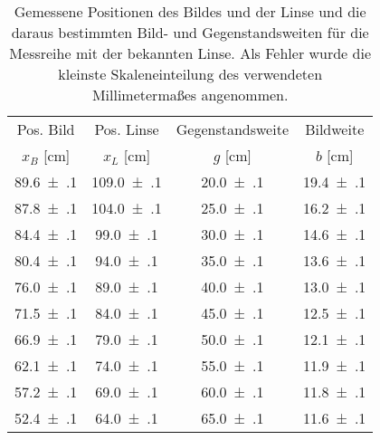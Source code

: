 \begin{table}[!h]
	\centering
	\begin{tabular}{|c|c|c|c|}
		\hline
		Pos. Bild & Pos. Linse & Gegenstandsweite & Bildweite\\
		$x_{B}$ [\si{\centi\meter}] & $x_{L}$ [\si{\centi\meter}] & $g$ [\si{\centi\meter}] & $b$ [\si{\centi\meter}]\\
\hline\hline
		\num{89.6(1)} & \num{109.0(1)} & \num{20.0(1)} & \num{19.4(1)}\\
		\num{87.8(1)} & \num{104.0(1)} & \num{25.0(1)} & \num{16.2(1)}\\
		\num{84.4(1)} & \num{99.0(1)} & \num{30.0(1)} & \num{14.6(1)}\\
		\num{80.4(1)} & \num{94.0(1)} & \num{35.0(1)} & \num{13.6(1)}\\
		\num{76.0(1)} & \num{89.0(1)} & \num{40.0(1)} & \num{13.0(1)}\\
		\num{71.5(1)} & \num{84.0(1)} & \num{45.0(1)} & \num{12.5(1)}\\
		\num{66.9(1)} & \num{79.0(1)} & \num{50.0(1)} & \num{12.1(1)}\\
		\num{62.1(1)} & \num{74.0(1)} & \num{55.0(1)} & \num{11.9(1)}\\
		\num{57.2(1)} & \num{69.0(1)} & \num{60.0(1)} & \num{11.8(1)}\\
		\num{52.4(1)} & \num{64.0(1)} & \num{65.0(1)} & \num{11.6(1)}\\
		\hline
	\end{tabular}
	\caption{Gemessene Positionen des Bildes und der Linse und die daraus bestimmten 
		Bild- und Gegenstandsweiten für die Messreihe mit der bekannten Linse. Als Fehler wurde die kleinste Skaleneinteilung des
		verwendeten Millimetermaßes angenommen.  \label{tab:Auswertung_Messwerte_I}}
\end{table}
